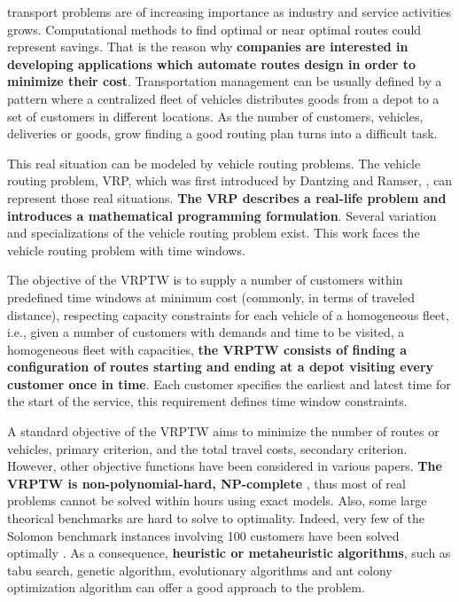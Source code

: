 
transport problems are of increasing importance as industry and service activities grows. Computational methods to find optimal or near optimal routes could represent savings. That is the reason why \textbf{companies are interested in developing applications which automate routes design in order to minimize their cost}. Transportation management can be usually defined by a pattern where a centralized fleet of vehicles distributes goods from a depot to a set of customers in different locations. As the number of customers, vehicles, deliveries or goods, grow finding a good routing plan turns into a difficult task.

This real situation can be modeled by vehicle routing problems. The vehicle routing problem, VRP, which was first introduced by Dantzing and Ramser, \cite{Dantzig}, can represent those real situations. \textbf{The VRP describes a real-life problem and introduces a mathematical programming formulation}. Several variation and specializations of the vehicle routing problem exist. This work faces the vehicle routing problem with time windows. 

The objective of the VRPTW is to supply a number of customers within predefined time windows at minimum cost (commonly, in terms of traveled distance), respecting capacity constraints for each vehicle of a homogeneous fleet, i.e., given a number of customers with demands and time to be visited, a homogeneous fleet with capacities, \textbf{the VRPTW consists of finding a configuration of routes starting and ending at a depot visiting every customer once in time}. Each customer specifies the earliest and latest time for the start of the service, this requirement defines time window constraints.

A standard objective of the VRPTW aims to minimize the number of routes or vehicles, primary criterion, and the total travel costs, secondary criterion. However, other objective functions have been considered in various papers.
\textbf{The VRPTW is non-polynomial-hard, NP-complete} \cite{Lenstra}, thus most of real problems cannot be solved within hours using exact models. Also, some large theorical benchmarks are hard to solve to optimality. Indeed, very few of the Solomon benchmark instances \cite{Solomon_1987} involving 100 customers have been solved optimally \cite{Fisher}.
As a consequence, \textbf{heuristic or metaheuristic algorithms}, such as tabu search, genetic algorithm, evolutionary algorithms and ant colony optimization algorithm can offer a good approach to the problem.

